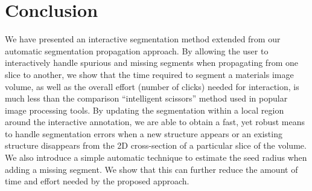 \documentclass[]{spie}  %
\begin{document}
\section{Conclusion}
\label{sec:conclusion}

We have presented an interactive segmentation method extended from our
automatic segmentation propagation approach.  By allowing the user to
interactively handle spurious and missing segments when propagating
from one slice to another, we show that the time required to segment a
materials image volume, as well as the overall effort (number of
clicks) needed for interaction, is much less than the comparison
``intelligent scissors'' method used in popular image processing
tools.  By updating the segmentation within a local region around the
interactive annotation, we are able to obtain a fast, yet robust means
to handle segmentation errors when a new structure appears or an
existing structure disappears from the 2D cross-section of a
particular slice of the volume.  We also introduce a simple automatic
technique to estimate the seed radius when adding a missing segment.
We show that this can further reduce the amount of time and effort
needed by the proposed approach.


\end{document}
